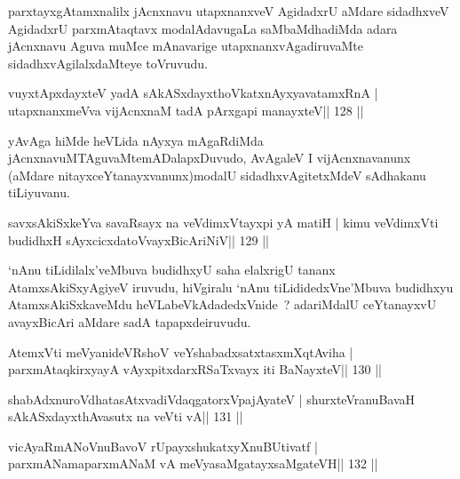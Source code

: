 \begin{artha}
parxtayxgAtamxnalilx jAcnxnavu utapxnanxveV AgidadxrU aMdare sidadhxveV AgidadxrU parxmAtaqtavx modalAdavugaLa saMbaMdhadiMda adara jAcnxnavu Aguva muMce mAnavarige utapxnanxvAgadiruvaMte sidadhxvAgilalxdaMteye toVruvudu.
\end{artha}


\begin{shl}
vuyxtApxdayxteV yadA sAkASxdayxthoVkatxnAyxyavatamxRnA |
utapxnanxmeVva vijAcnxnaM tadA pArxgapi manayxteV\hfill || 128 ||
\end{shl}

\begin{artha}
yAvAga hiMde heVLida nAyxya mAgaRdiMda jAcnxnavuMTAguvaMte\break mADalapxDuvudo, AvAgaleV I vijAcnxnavanunx (aMdare nitayxceYtanayxvanunx)\break modalU sidadhxvAgitetxMdeV sAdhakanu tiLiyuvanu.
\end{artha}

\begin{shl}
savxsAkiSxkeYva savaRsayx na veVdimxVtayxpi yA matiH |
kimu veVdimxVti budidhxH sAyxcicxdatoV\s vayxBicAriNiV\hfill || 129 ||
\end{shl}

\begin{artha}
`nAnu tiLidilalx'veMbuva budidhxyU saha elalxrigU tananx AtamxsAkiSxyAgiyeV iruvudu, hiVgiralu `nAnu tiLididedxVne'Mbuva budidhxyu AtamxsAkiSxkaveMdu heVLabeVkAdadedxVnide~? adariMdalU ceYtanayxvU avayxBicAri aMdare sadA tapapxde\break iruvudu.
\end{artha}


\begin{shl}
AtemxVti meVyanideVRshoV veYshabadxsatxtasxmXqtAviha |
parxmAtaqkirxyayA vAyxpitxdarxRSaTxvayx iti BaNayxteV\hfill || 130 ||
\end{shl}

\begin{shl}
shabAdxnuroVdhatasAtxvadiVdaqgatorxVpajAyateV |
shurxteVranuBavaH sAkASxdayxthAvasutx na veVti vA\hfill || 131 ||
\end{shl}

\begin{shl}
vicAyaRmANoV\s nuBavoV rUpayxshukatxyXnuBUtivatf |
parxmANamaparxmANaM vA meVyasaMgatayxsaMgateVH\hfill || 132 ||
\end{shl}

